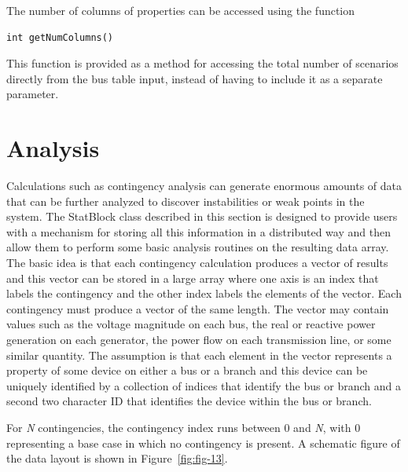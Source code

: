 \documentclass[12pt]{report} %
\begin{document}
The number of columns of properties can be accessed using the function

{
\color{red}
\begin{Verbatim}[fontseries=b]
int getNumColumns()
\end{Verbatim}
}

This function is provided as a method for accessing the total number of scenarios directly from the bus table input, instead of having to include it as a separate parameter.

\section{Analysis}

Calculations such as contingency analysis can generate enormous amounts of data that can be further analyzed to discover instabilities or weak points in the system. The StatBlock class described in this section is designed to provide users with a mechanism for storing all this information in a distributed way and then allow them to perform some basic analysis routines on the resulting data array. The basic idea is that each contingency calculation produces a vector of results and this vector can be stored in a large array where one axis is an index that labels the contingency and the other index labels the elements of the vector. Each contingency must produce a vector of the same length. The vector may contain values such as the voltage magnitude on each bus, the real or reactive power generation on each generator, the power flow on each transmission line, or some similar quantity. The assumption is that each element in the vector represents a property of some device on either a bus or a branch and this device can be uniquely identified by a collection of indices that identify the bus or branch and a second two character ID that identifies the device within the bus or branch.

For \textit{N} contingencies, the contingency index runs between 0 and \textit{N}, with 0 representing a base case in which no contingency is present. A schematic figure of the data layout is shown in Figure~\ref{fig:fig-13}.
\end{document}
